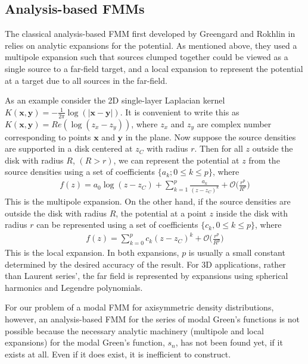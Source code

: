 \documentclass[11pt, oneside]{article}   	%
\begin{document}
\subsection{Analysis-based FMMs}
The classical analysis-based FMM first developed by Greengard and Rokhlin in \cite{GR} relies on analytic expansions for the potential. As mentioned above, they used a multipole expansion such that sources clumped together could be viewed as a single source to a far-field target, and a local expansion to represent the potential at a target due to all sources in the far-field.

As an example consider the 2D single-layer Laplacian kernel $K(\mathbf{x},\mathbf{y})=-\frac{1}{2\pi}\log(|\mathbf{x}-\mathbf{y}|)$. It is convenient to write this as $K(\mathbf{x},\mathbf{y})=Re(\log(z_x-z_y))$, where $z_x$ and $z_y$ are complex number corresponding to points $\mathbf{x}$ and $\mathbf{y}$ in the plane. Now suppose the source densities are supported in a disk centered at $z_C$ with radius $r$. Then for all $z$ outside the disk with radius $R$, $(R > r)$, we can represent the potential at $z$ from the source densities using a set of coefficients $\{a_k ; 0 \le k \le p\}$, where
\begin{align}
f(z)=a_0\log(z-z_C)+\sum_{k=1}^p\frac{a_k}{(z-z_C)^k}+\mathcal{O}\bigg(\frac{r^p}{R^p}\bigg)
\end{align}
This is the multipole expansion. On the other hand, if the source densities are outside the disk with radius $R$, the potential at a point $z$ inside the disk with radius $r$ can be represented using a set of coefficients $\{c_k, 0\le k\le p\}$, where
\begin{align}
f(z)=\sum_{k=0}^pc_k(z-z_C)^k+\mathcal{O}\bigg(\frac{r^p}{R^p}\bigg)
\end{align}
This is the local expansion. In both expansions, $p$ is usually a small constant determined by the desired accuracy of the result. For 3D applications, rather than Laurent series', the far field is represented by expansions using spherical harmonics and Legendre polynomials.

For our problem of a modal FMM for axisymmetric density distributions, however, an analysis-based FMM for the series of modal Green's functions is not possible because the necessary analytic machinery (multipole and local expansions) for the modal Green's function, $s_n$, has not been found yet, if it exists at all. Even if it does exist, it is inefficient to construct.
\end{document}
